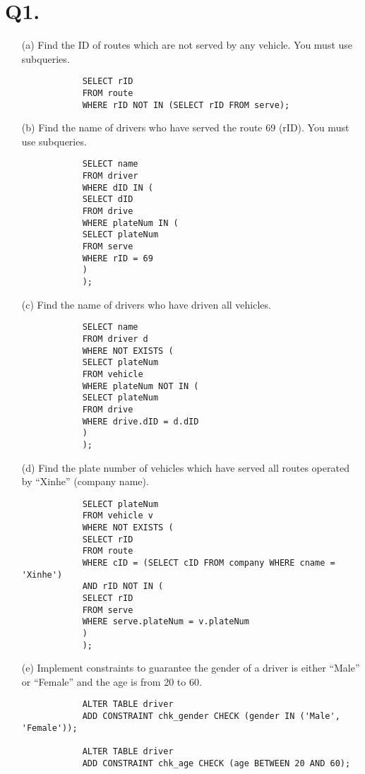 \documentclass[12pt]{article}
\begin{document}
	\section*{Q1.}
	\begin{enumerate}
		\item[(a)] Find the ID of routes which are not served by any vehicle. You must use subqueries.

		\begin{verbatim}
			SELECT rID 
			FROM route 
			WHERE rID NOT IN (SELECT rID FROM serve);
		\end{verbatim}
		
		\item[(b)] Find the name of drivers who have served the route 69 (rID). You must use subqueries.

		\begin{verbatim}
			SELECT name 
			FROM driver 
			WHERE dID IN (
			SELECT dID 
			FROM drive 
			WHERE plateNum IN (
			SELECT plateNum 
			FROM serve 
			WHERE rID = 69
			)
			);
		\end{verbatim}
		
		\item[(c)] Find the name of drivers who have driven all vehicles.

		\begin{verbatim}
			SELECT name 
			FROM driver d 
			WHERE NOT EXISTS (
			SELECT plateNum 
			FROM vehicle 
			WHERE plateNum NOT IN (
			SELECT plateNum 
			FROM drive 
			WHERE drive.dID = d.dID
			)
			);
		\end{verbatim}
		
		\item[(d)] Find the plate number of vehicles which have served all routes operated by ``Xinhe'' (company name).

		\begin{verbatim}
			SELECT plateNum 
			FROM vehicle v 
			WHERE NOT EXISTS (
			SELECT rID 
			FROM route 
			WHERE cID = (SELECT cID FROM company WHERE cname = 'Xinhe')
			AND rID NOT IN (
			SELECT rID 
			FROM serve 
			WHERE serve.plateNum = v.plateNum
			)
			);
		\end{verbatim}
		
		\item[(e)] Implement constraints to guarantee the gender of a driver is either ``Male'' or ``Female'' and the age is from 20 to 60.

		\begin{verbatim}
			ALTER TABLE driver
			ADD CONSTRAINT chk_gender CHECK (gender IN ('Male', 'Female'));
			
			ALTER TABLE driver
			ADD CONSTRAINT chk_age CHECK (age BETWEEN 20 AND 60);
		\end{verbatim}
		
	\end{enumerate}
	
\end{document}
